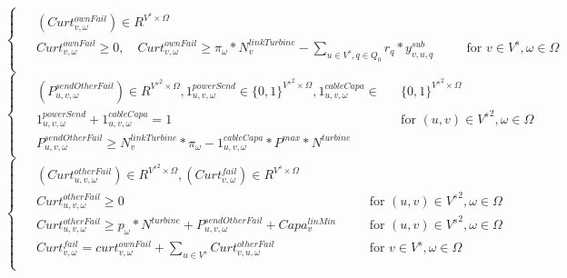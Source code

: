 \documentclass[a4paper,12pt]{article}
\begin{document}
    \begin{equation}
        \begin{cases}
            \begin{alignedat}{2}
                & (Curt_{v, \omega}^{ownFail}) \in R^{V^s \times \Omega} \\
                & Curt_{v, \omega}^{ownFail} \geq 0, \quad Curt_{v, \omega}^{ownFail} \geq \pi_\omega * N_v^{linkTurbine} - \sum_{u \in V^s, q \in Q_0} r_q * y_{v,u,q}^{sub} \quad &&  \text{for } v \in V^s, \omega \in \Omega \\
            \end{alignedat}
        \end{cases}
    \end{equation}
    \begin{equation}
        \begin{cases}
            \begin{alignedat}{2}
                & (P_{u,v,\omega}^{sendOtherFail}) \in R^{{V^s}^2 \times \Omega}, 1_{u,v,\omega}^{powerSend} \in \{0,1\}^{{V^{s}}^2 \times \Omega},  1_{u,v,\omega}^{cableCapa} \in && \{0,1\}^{{V^{s}}^2 \times \Omega} \\
                & 1_{u,v,\omega}^{powerSend} + 1_{u,v,\omega}^{cableCapa} = 1 && \text{for } (u,v) \in {V^s}^2, \omega \in \Omega \\
                & P_{u,v,\omega}^{sendOtherFail} \geq N_v^{linkTurbine} * \pi_\omega - 1_{u,v,\omega}^{cableCapa} * P^{max} * N^{turbine}
            \end{alignedat}
        \end{cases}
    \end{equation}
    \begin{equation}
        \begin{cases}
            \begin{alignedat}{2}
                & (Curt_{u,v,\omega}^{otherFail}) \in R^{{V^s}^2 \times \Omega}, (Curt_{v,\omega}^{fail}) \in R^{V^s \times \Omega} \\
                & Curt_{u,v,\omega}^{otherFail} \geq 0 && \text{for } (u,v) \in {V^s}^2, \omega \in \Omega \\
                & Curt_{u,v,\omega}^{otherFail} \geq p_\omega * N^{turbine} + P_{u,v,\omega}^{sendOtherFail} + Capa_v^{linMin} \quad && \text{for } (u,v) \in {V^s}^2, \omega \in \Omega \\
                & Curt_{v,\omega}^{fail} = curt_{v,\omega}^{ownFail} + \sum_{u \in V^s} Curt_{v,u,\omega}^{otherFail} \quad && \text{for } v \in V^s, \omega \in \Omega \\
            \end{alignedat}
        \end{cases}
    \end{equation}
\end{document}
